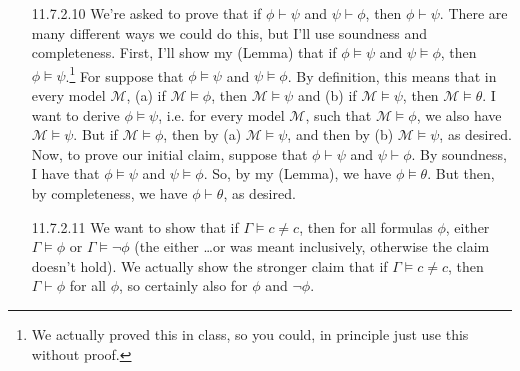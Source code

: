 \begin{itemize}
                          \item[11.7.2.10] We're asked to prove that if
                            $\phi\vdash\psi$ and $\psi\vdash\phi$,
                            then $\phi\vdash\psi$. There are many
                            different ways we could do this, but I'll
                            use soundness and completeness. First,
                            I'll show my (Lemma) that  if
                            $\phi\vDash\psi$ and $\psi\vDash\phi$,
                            then $\phi\vDash\psi$.\footnote{We
                              actually proved this in class, so you
                              could, in principle just use this
                              without proof.} For suppose that
                            $\phi\vDash\psi$ and
                            $\psi\vDash\phi$. By definition, this
                            means that in every 
                            model $\mathcal{M}$, (a) if $\mathcal{M}\vDash
                            \phi$, then $\mathcal{M}\vDash \psi$ and (b)
                            if $\mathcal{M}\vDash \psi$, then
                            $\mathcal{M}\vDash\theta$. I want to
                            derive $\phi\vDash\psi$, i.e. for every
                            model $\mathcal{M}$,
                            such that $\mathcal{M}\vDash\phi$, we also
                            have $\mathcal{M}\vDash\psi$. But if
                            $\mathcal{M}\vDash\phi$, then by (a)
                            $\mathcal{M}\vDash\psi$, and then by (b)
                            $\mathcal{M}\vDash\psi$, as desired. Now,
                            to prove our initial claim, suppose that
                            $\phi\vdash\psi$ and $\psi\vdash\phi$. By
                            soundness, I have that  $\phi\vDash\psi$
                            and $\psi\vDash\phi$. So, by my (Lemma), we
                            have $\phi\vDash\theta$. But then, by
                            completeness, we have $\phi\vdash\theta$,
                            as desired.

                            \item[11.7.2.11] We want to show that if
                              $\Gamma\vDash c\neq c$, then for all
                              formulas $\phi$, either $\Gamma\vDash\phi$ or
                              $\Gamma\vDash\neg\phi$ (the either
                              \dots or was meant
                              inclusively, otherwise the claim doesn't
                              hold). We actually show the stronger
                              claim that if $\Gamma\vDash c\neq c$,
                              then $\Gamma\vdash\phi$ for all $\phi$,
                              so certainly also for $\phi$ and
                              $\neg\phi$.


\end{itemize}
